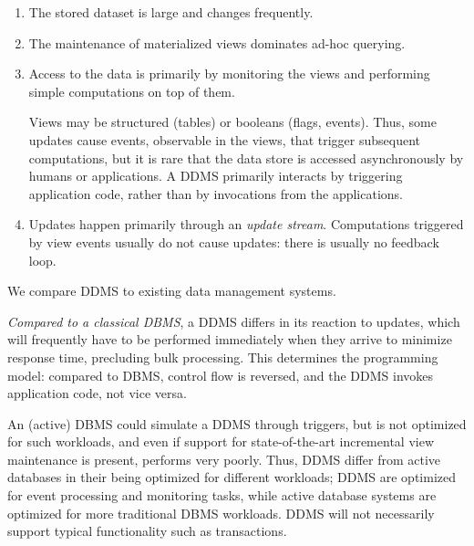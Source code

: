 \begin{enumerate}
\item
The stored dataset is large and changes frequently.

\item 
The
maintenance of materialized views dominates ad-hoc querying.

\item
Access to the data is primarily by monitoring the views and performing
simple computations on top of them.

%
%
Views may be structured (tables) or booleans (flags, events). Thus, some updates
cause events, observable in the views, that trigger subsequent computations, but
it is rare that the data store is accessed asynchronously by humans or
applications. A DDMS primarily interacts by triggering application code, rather
than by invocations from the applications.



\item
Updates happen primarily through an {\em update stream}\/. Computations
triggered by view events usually do not cause updates: there is usually no
feedback loop.

\end{enumerate}




\noindent We compare DDMS to existing data management systems.

{\em Compared to a classical DBMS}\/, a DDMS differs in its reaction to updates,
which will frequently have to be performed immediately when they arrive to
minimize response time, precluding bulk processing. This determines the
programming model: compared to DBMS, control flow is reversed, and the DDMS
invokes application code, not vice versa. 


An (active) DBMS could simulate a DDMS through triggers, but is not optimized
for such workloads, and even if support for state-of-the-art incremental
view maintenance is present, performs very poorly. Thus, DDMS differ from active
databases in their being optimized for different workloads; DDMS are
optimized for event processing and monitoring tasks, while active database
systems are optimized for more traditional DBMS workloads. DDMS will not
necessarily support typical functionality such as transactions.


